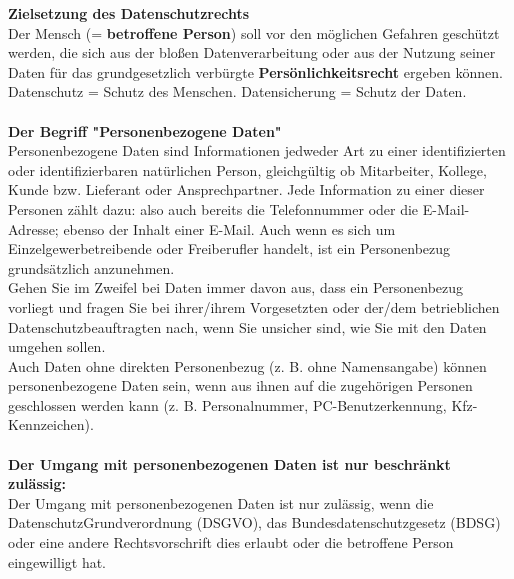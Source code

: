 \documentclass[../Vorlagen/de-RSE_Kopf,a4paper]{scrlttr2}
\begin{document}
\textbf{Zielsetzung des Datenschutzrechts}\\
Der Mensch (= \textbf{betroffene Person}) soll vor den möglichen Gefahren geschützt werden, die sich aus der bloßen Datenverarbeitung oder aus der Nutzung seiner Daten für das grundgesetzlich verbürgte \textbf{Persönlichkeitsrecht} ergeben können.\\
Datenschutz = Schutz des Menschen. Datensicherung = Schutz der Daten.\\
\\
\textbf{Der Begriff "Personenbezogene Daten"}\\
Personenbezogene Daten sind Informationen jedweder Art zu einer identifizierten oder identifizierbaren natürlichen Person, gleichgültig ob Mitarbeiter, Kollege, Kunde bzw. Lieferant oder Ansprechpartner. Jede Information zu einer dieser Personen zählt dazu: also auch bereits die Telefonnummer oder die E-Mail-Adresse; ebenso der Inhalt einer E-Mail. Auch wenn es sich um Einzelgewerbetreibende oder Freiberufler handelt, ist ein Personenbezug grundsätzlich anzunehmen.\\
Gehen Sie im Zweifel bei Daten immer davon aus, dass ein Personenbezug vorliegt und fragen Sie bei ihrer/ihrem Vorgesetzten oder der/dem betrieblichen Datenschutzbeauftragten nach, wenn Sie unsicher sind, wie Sie mit den Daten umgehen sollen.\\
Auch Daten ohne direkten Personenbezug (z. B. ohne Namensangabe) können personenbezogene Daten sein, wenn aus ihnen auf die zugehörigen Personen geschlossen werden kann (z. B. Personalnummer, PC-Benutzerkennung, Kfz-Kennzeichen).\\
\\
\textbf{Der Umgang mit personenbezogenen Daten ist nur beschränkt zulässig:}\\
Der Umgang mit personenbezogenen Daten ist nur zulässig, wenn die DatenschutzGrundverordnung (DSGVO), das Bundesdatenschutzgesetz (BDSG) oder eine andere Rechtsvorschrift dies erlaubt oder die betroffene Person eingewilligt hat.\\
\end{document}
